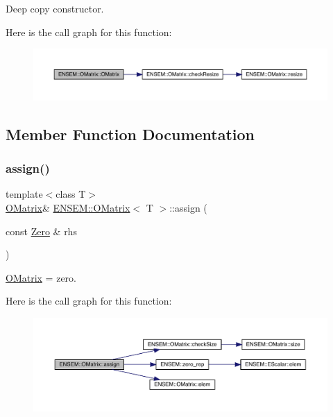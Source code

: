 Deep copy constructor. 

Here is the call graph for this function\+:
\nopagebreak
\begin{figure}[H]
\begin{center}
\leavevmode
\includegraphics[width=350pt]{dd/d80/classENSEM_1_1OMatrix_a695677059e35f7e9933f2b55d2eacb52_cgraph}
\end{center}
\end{figure}


\subsection{Member Function Documentation}
\mbox{\label{classENSEM_1_1OMatrix_a9b8826edfb36e1bc701a7778424cfe31}} 
\subsubsection{\texorpdfstring{assign()}{assign()}\hspace{0.1cm}{\footnotesize\ttfamily [1/9]}}
{\footnotesize\ttfamily template$<$class T$>$ \\
\mbox{\hyperlink{classENSEM_1_1OMatrix}{O\+Matrix}}\& \mbox{\hyperlink{classENSEM_1_1OMatrix}{E\+N\+S\+E\+M\+::\+O\+Matrix}}$<$ T $>$\+::assign (\begin{DoxyParamCaption}\item[{const \mbox{\hyperlink{structENSEM_1_1Zero}{Zero}} \&}]{rhs }\end{DoxyParamCaption})\hspace{0.3cm}{\ttfamily [inline]}}



\mbox{\hyperlink{classENSEM_1_1OMatrix}{O\+Matrix}} = zero. 

Here is the call graph for this function\+:
\nopagebreak
\begin{figure}[H]
\begin{center}
\leavevmode
\includegraphics[width=350pt]{dd/d80/classENSEM_1_1OMatrix_a9b8826edfb36e1bc701a7778424cfe31_cgraph}
\end{center}
\end{figure}
\mbox{\label{classENSEM_1_1OMatrix_a9b8826edfb36e1bc701a7778424cfe31}} 
